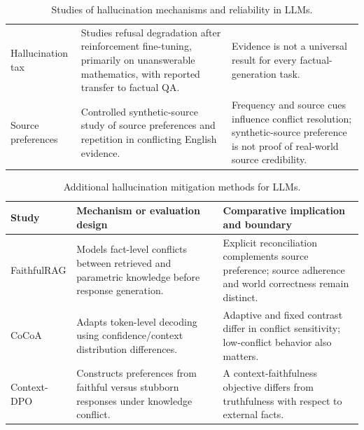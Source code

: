 \begin{table}[tp]
\begin{tabularx}{\textwidth}{@{}p{}p{}X@{}}
Hallucination tax \citep{song-etal-2025-hallucination} & Studies refusal degradation after reinforcement fine-tuning, primarily on unanswerable mathematics, with reported transfer to factual QA. & Evidence is not a universal result for every factual-generation task. \\
Source preferences \citep{schuster-etal-2026-whose} & Controlled synthetic-source study of source preferences and repetition in conflicting English evidence. & Frequency and source cues influence conflict resolution; synthetic-source preference is not proof of real-world source credibility. \\
\bottomrule\end{tabularx}
\caption{Studies of hallucination mechanisms and reliability in LLMs.}
\label{tab:extra-analysis}
\end{table}

\begin{table}[tp]
\centering\small\setlength{\tabcolsep}{5pt}\renewcommand{\arraystretch}{1.18}
\begin{tabularx}{\textwidth}{@{}p{}p{}X@{}}\toprule
Study & Mechanism or evaluation design & Comparative implication and boundary \\\midrule
FaithfulRAG \citep{zhang-etal-2025-faithfulrag} & Models fact-level conflicts between retrieved and parametric knowledge before response generation. & Explicit reconciliation complements source preference; source adherence and world correctness remain distinct. \\
CoCoA \citep{khandelwal-etal-2025-cocoa} & Adapts token-level decoding using confidence/context distribution differences. & Adaptive and fixed contrast differ in conflict sensitivity; low-conflict behavior also matters. \\
Context-DPO \citep{bi-etal-2025-context} & Constructs preferences from faithful versus stubborn responses under knowledge conflict. & A context-faithfulness objective differs from truthfulness with respect to external facts. \\
\bottomrule\end{tabularx}
\caption{Additional hallucination mitigation methods for LLMs.}
\label{tab:extra-mitigation}
\end{table}
